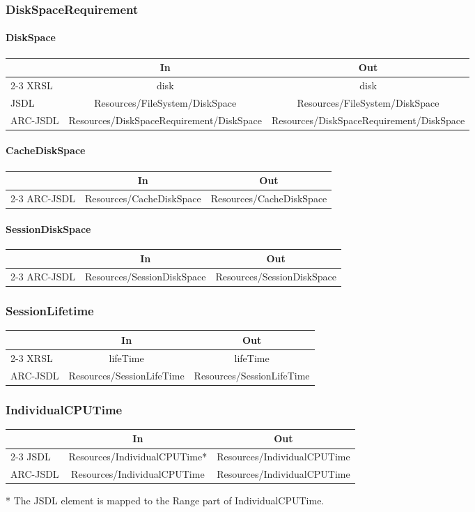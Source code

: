 \documentclass{article}
\newcommand{\subsubsubsection}[1]{\paragraph{#1}}
\newenvironment{inouttabular}%
{\begin{center}\begin{tabular}{l>{\ttfamily\footnotesize}c>{\ttfamily\footnotesize}c}%
\toprule
& \textnormal{\normalsize{In}} & \textnormal{\normalsize{Out}}\\ \cmidrule{2-3}}
{\bottomrule\end{tabular}\end{center}}
\begin{document}
\subsubsection{DiskSpaceRequirement}
\subsubsubsection{DiskSpace}
\begin{inouttabular}
XRSL & disk & disk\\
JSDL & Resources/FileSystem/DiskSpace & Resources/FileSystem/DiskSpace\\
ARC-JSDL & Resources/DiskSpaceRequirement/DiskSpace & Resources/DiskSpaceRequirement/DiskSpace\\
\end{inouttabular}

\subsubsubsection{CacheDiskSpace}
\begin{inouttabular}
ARC-JSDL & Resources/CacheDiskSpace & Resources/CacheDiskSpace\\
\end{inouttabular}

\subsubsubsection{SessionDiskSpace}
\begin{inouttabular}
ARC-JSDL & Resources/SessionDiskSpace & Resources/SessionDiskSpace\\
\end{inouttabular}

\subsubsection{SessionLifetime}
\begin{inouttabular}
XRSL & lifeTime & lifeTime\\
ARC-JSDL & Resources/SessionLifeTime & Resources/SessionLifeTime\\
\end{inouttabular}

\subsubsection{IndividualCPUTime}
\begin{inouttabular}
JSDL & Resources/IndividualCPUTime* & Resources/IndividualCPUTime\\
ARC-JSDL & Resources/IndividualCPUTime & Resources/IndividualCPUTime\\
\end{inouttabular}
* The JSDL element is mapped to the Range part of
IndividualCPUTime.
\end{document}
